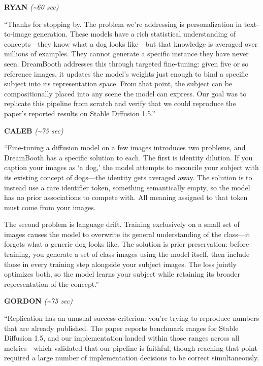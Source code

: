 \documentclass[12pt]{article}
\begin{document}
\textbf{RYAN} \textit{(\textasciitilde{}60 sec)}

``Thanks for stopping by. The problem we're addressing is personalization in text-to-image generation. These models have a rich statistical understanding of concepts---they know what a dog looks like---but that knowledge is averaged over millions of examples. They cannot generate a specific instance they have never seen. DreamBooth addresses this through targeted fine-tuning: given five or so reference images, it updates the model's weights just enough to bind a specific subject into its representation space. From that point, the subject can be compositionally placed into any scene the model can express. Our goal was to replicate this pipeline from scratch and verify that we could reproduce the paper's reported results on Stable Diffusion 1.5.''

\textbf{CALEB} \textit{(\textasciitilde{}75 sec)}

``Fine-tuning a diffusion model on a few images introduces two problems, and DreamBooth has a specific solution to each. The first is identity dilution. If you caption your images as `a dog,' the model attempts to reconcile your subject with its existing concept of dogs---the identity gets averaged away. The solution is to instead use a rare identifier token, something semantically empty, so the model has no prior associations to compete with. All meaning assigned to that token must come from your images.

The second problem is language drift. Training exclusively on a small set of images causes the model to overwrite its general understanding of the class---it forgets what a generic dog looks like. The solution is prior preservation: before training, you generate a set of class images using the model itself, then include those in every training step alongside your subject images. The loss jointly optimizes both, so the model learns your subject while retaining its broader representation of the concept.''

\textbf{GORDON} \textit{(\textasciitilde{}75 sec)}

``Replication has an unusual success criterion: you're trying to reproduce numbers that are already published. The paper reports benchmark ranges for Stable Diffusion 1.5, and our implementation landed within those ranges across all metrics---which validated that our pipeline is faithful, though reaching that point required a large number of implementation decisions to be correct simultaneously.
\end{document}

